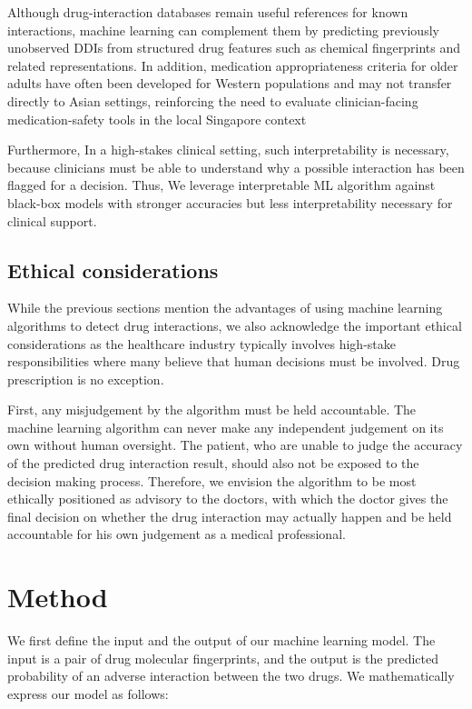 \documentclass[letterpaper]{article} %
\begin{document}
Although drug-interaction databases remain useful references for known interactions, machine learning can complement them by predicting previously unobserved DDIs from structured drug features such as chemical fingerprints and related representations. In addition, medication appropriateness criteria for older adults have often been developed for Western populations and may not transfer directly to Asian settings, reinforcing the need to evaluate clinician-facing medication-safety tools in the local Singapore context

Furthermore, In a high-stakes clinical setting, such interpretability is necessary, because clinicians must be able to understand why a possible interaction has been flagged for a decision.\cite{Nasarian2024} Thus, We leverage interpretable ML algorithm against black-box models with stronger accuracies but less interpretability necessary for clinical support.

\subsection{Ethical considerations}

While the previous sections mention the advantages of using machine learning algorithms to detect drug interactions, we also acknowledge the important ethical considerations as the healthcare industry typically involves high-stake responsibilities where many believe that human decisions must be involved. Drug prescription is no exception. 

First, any misjudgement by the algorithm must be held accountable. The machine learning algorithm can never make any independent judgement on its own without human oversight. The patient, who are unable to judge the accuracy of the predicted drug interaction result, should also not be exposed to the decision making process. Therefore, we envision the algorithm to be most ethically positioned as advisory to the doctors, with which the doctor gives the final decision on whether the drug interaction may actually happen and be held accountable for his own judgement as a medical professional.

\section{Method}

We first define the input and the output of our machine learning model. The input is a pair of drug molecular fingerprints, and the output is the predicted probability of an adverse interaction between the two drugs.
We mathematically express our model as follows:
\end{document}
